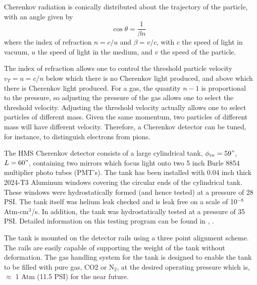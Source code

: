 {Cherenkov radiation is conically distributed about the trajectory of the
particle, with an angle given by
$$
	\cos{\theta} = \frac{1}{\beta n}
$$
where the index of refraction $n = c/u$ and $\beta = v/c$, with $c$
the speed of light in vacuum, $u$ the speed of light in the medium,
and $v$ the speed of the particle.

The index of refraction allows one to control the threshold particle velocity
$v_{T}=u=c/n$ below which there is no Cherenkov light produced, and above which there
is Cherenkov light produced.  For a gas, the quantity $n-1$ is proportional to the pressure,
so adjusting the pressure of the gas allows one to select the
threshold velocity. Adjusting the threshold velocity actually allows one to select particles of
different mass.  Given the same momentum, two particles of different mass
will have different velocity.  Therefore, a Cherenkov detector can be tuned,
for instance, to distinguish electrons from pions.

	The HMS Cherenkov detector consists of a large cylindrical
tank, $\phi_{in} = 59"$, $L = 60"$, containing two mirrors which focus
light onto two 5 inch Burle 8854 multiplier photo  tubes (PMT's). The tank
has been installed with 0.04 inch thick 2024-T3 Aluminum windows
covering the circular ends of the cylindrical tank. These
windows were hydrostatically formed (and hence tested) at a pressure
of 28 PSI. The tank itself was helium leak checked and is leak free
on a scale of 10$^{-8}$ Atm-cm$^3$/s. In addition, the tank was hydrostatically
tested at a pressure of 35 PSI. Detailed information on this testing
program can be found in \cite {bi:tank}, \cite {bi:wind}.

The tank is mounted on the detector rails using a three point
alignment scheme. The rails are easily capable of supporting the
weight of the tank without deformation.
The gas handling system for the tank
is designed to enable the tank to be filled with
pure gas, CO2 or N$_2$, at the desired operating
pressure which is, $\approx$ 1 Atm (11.5 PSI) for the near future.

}
